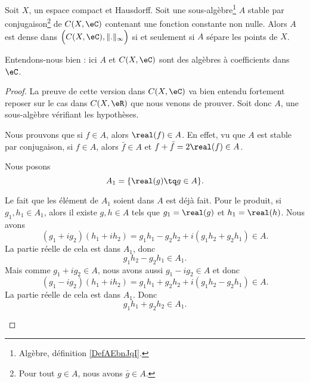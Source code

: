 \begin{theorem} \label{ThoWmAzSMF}
	Soit \( X\), un espace compact et Hausdorff. Soit une sous-algèbre\footnote{Algèbre, définition \ref{DefAEbnJqI}.} \( A\) stable par conjugaison\footnote{Pour tout \( g\in A\), nous avons \( \bar g\in A\).} de \( C(X,\eC)\) contenant une fonction constante non nulle. Alors \( A\) est dense dans \( \Big( C(X,\eC),\| . \|_{\infty}\Big)\) si et seulement si \( A\) sépare les points de \(X\).

	Entendons-nous bien : ici \( A\) et \( C(X,\eC)\) sont des algèbres à coefficients dans \( \eC\).
\end{theorem}

\begin{proof}
	La preuve de cette version dans \( C(X,\eC)\) va bien entendu fortement reposer sur le cas dans \( C(X,\eR)\) que nous venons de prouver. Soit donc \( A\), une sous-algèbre vérifiant les hypothèses.
	\begin{subproof}
		Nous prouvons que si \( f\in A\), alors \( \real(f)\in A\). En effet, vu que \( A\) est stable par conjugaison, si \( f\in A\), alors \( \bar f\in A\) et \( f+\bar f=2\real(f)\in A\).
	\end{subproof}
	Nous posons
	\begin{equation}
		A_1=\{ \real(g)\tq g\in A \}.
	\end{equation}
	\begin{subproof}
		Le fait que les élément de \( A_1\) soient dans \( A\) est déjà fait. Pour le produit, si \( g_1,h_1\in A_1\), alors il existe \( g,h\in A\) tels que \( g_1=\real(g)\) et \( h_1=\real(h)\). Nous avons
		\begin{equation}
			(g_1+ig_2)(h_1+ih_2)=g_1h_1-g_2h_2+i(g_1h_2+g_2h_1)\in A.
		\end{equation}
		La partie réelle de cela est dans \( A_1\), donc
		\begin{equation}        \label{EQooYAGUooJVpaEa}
			g_1h_2-g_2h_1\in A_1.
		\end{equation}
		Mais comme \( g_1+ig_2\in A\), nous avons aussi \( g_1-ig_2\in A \) et donc
		\begin{equation}
			(g_1-ig_2)(h_1+ih_2)=g_1h_1+g_2h_2+i(g_1h_2-g_2h_1)\in A.
		\end{equation}
		La partie réelle de cela est dans \( A_1\). Donc
		\begin{equation}
			g_1h_1+g_2h_2\in A_1.
		\end{equation}

\end{subproof}
\end{proof}
